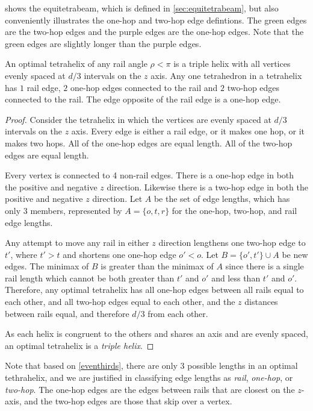 \documentclass[review]{siamonline1116}
\begin{document}
 shows the equitetrabeam, which is defined in \cref{sec:equitetrabeam},
but also conveniently illustrates the one-hop and two-hop edge defintions.
The green edges are the two-hop edges and the purple edges are the one-hop edges. Note that the green
edges are slightly longer than the purple edges.


\begin{theorem}
  \label{eventhirds}
  An optimal tetrahelix of any rail angle $\rho < \pi$ is a triple helix with all vertices evenly spaced at $d/3$ intervals on the $z$ axis.
  Any one tetrahedron in a tetrahelix has $1$ rail edge, $2$ one-hop edges connected to the rail and $2$ two-hop edges connected to the rail.
  The edge opposite of the rail edge is a one-hop edge.
\end{theorem}

\begin{proof}
    Consider the tetrahelix in which the vertices are evenly spaced at
    $d/3$ intervals on the $z$ axis. Every edge is either a rail edge,
    or it makes one hop, or it makes two hops. All of the one-hop
    edges are equal length.  All of the two-hop edges are equal
    length.

    Every vertex is connected to 4 non-rail edges. There is a one-hop edge
    in both the positive and negative $z$ direction. Likewise there is a two-hop
    edge in both the positive and negative $z$ direction. Let $A$ be the set
    of edge lengths, which has only 3 members, represented by $A = \{o,t,r\}$ for
    the one-hop, two-hop, and rail edge lengths.

    Any attempt to move any rail in either $z$ direction lengthens one two-hop edge to $t'$, where $t' > t$
    and shortens one one-hop edge $o' < o$. Let $B = \{o',t' \} \cup A$ be new edges.
    The minimax of $B$ is greater than the minimax of $A$ since there is a single rail length which cannot be both greater
    than $t'$ and $o'$ and less than $t'$ and $o'$.
    Therefore, any optimal tetrahelix has all one-hop edges between all rails equal to each other, and
    all two-hop edges equal to each other, and the $z$ distances between rails equal, and therefore
    $d/3$ from each other.

    As each helix is congruent to the others and shares an axis and are evenly spaced,
    an optimal tetrahelix is a \emph{triple helix}.
\end{proof}

 Note that based on \cref{eventhirds}, there are only 3 possible lengths in an optimal tethrahelix,
 and we are justified in classifying edge lengths as \emph{rail}, \emph{one-hop}, or
\emph{two-hop}. The one-hop edges are the edges between rails that are closest on the $z$-axis, and the two-hop edges are those that skip over a vertex.
\end{document}
